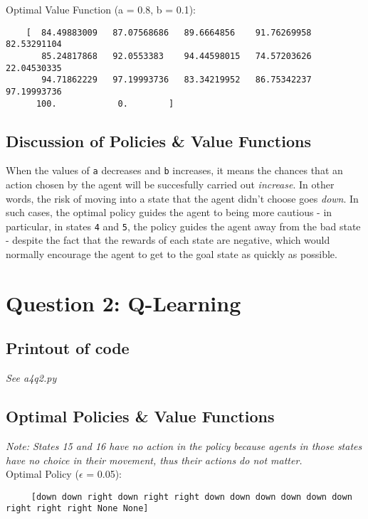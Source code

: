\documentclass{article}
\begin{document}
  \noindent
  Optimal Value Function (a = 0.8, b = 0.1):
  \begin{verbatim}
    [  84.49883009   87.07568686   89.6664856    91.76269958   82.53291104
       85.24817868   92.0553383    94.44598015   74.57203626   22.04530335
       94.71862229   97.19993736   83.34219952   86.75342237   97.19993736
      100.            0.        ]
  \end{verbatim}

  \subsection*{Discussion of Policies \& Value Functions}

  When the values of \texttt{a} decreases and \texttt{b} increases, it means the chances that an action chosen by the
  agent will be succesfully
  carried out \textit{increase}. In other words, the risk of moving into a state that the agent didn't choose goes \textit{down}. In such
  cases, the optimal policy guides the agent to being more cautious - in particular, in states \texttt{4} and \texttt{5},
  the policy guides the agent away from the bad state - despite the fact that the rewards of each state are negative,
  which would normally encourage the agent to get to the goal state as quickly as possible.

\newpage

\section*{Question 2: Q-Learning}
\normalsize

	\subsection*{Printout of code}

	\textit{See a4q2.py}

  \subsection*{Optimal Policies \& Value Functions}
  \noindent
  \textit{Note: States 15 and 16 have no action in the policy because agents in those states have no choice in their
  movement, thus their actions do not matter.} \\

  \noindent
  Optimal Policy ($\epsilon$ = 0.05):
  \begin{verbatim}
     [down down right down right right down down down down down down right right right None None]
  \end{verbatim}
\end{document}
